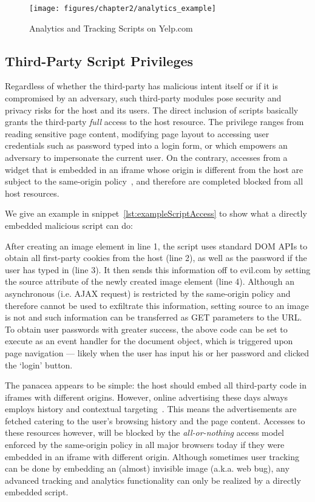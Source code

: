\begin{figure}[bth]
\centering
\texttt{[image: figures/chapter2/analytics\_example]}
\caption{Analytics and Tracking Scripts on Yelp.com}
\label{fig:analytics_example}
\end{figure}

\subsection{Third-Party Script Privileges}
Regardless of whether the third-party has malicious intent itself or if it is compromised by an adversary, such third-party modules pose security and privacy risks for the host and its users.  The direct inclusion of scripts basically grants the third-party \emph{full} access to the host resource.  The privilege ranges from reading sensitive page content, modifying page layout to accessing user credentials such as password typed into a login form, or  which empowers an adversary to impersonate the current user.  On the contrary, accesses from a widget that is embedded in an iframe whose origin is different from the host are subject to the same-origin policy~\cite{SOP}, and therefore are completed blocked from all host resources.

We give an example in snippet~\ref{lst:exampleScriptAccess} to show what a directly embedded malicious script can do:  



After creating an image element in line 1, the script uses standard DOM APIs to obtain all first-party cookies from the host (line 2), as well as the password if the user has typed in (line 3).  It then sends this information off to evil.com by setting the source attribute of the newly created image element (line 4).  Although an asynchronous  (i.e. AJAX request) is restricted by the same-origin policy and therefore cannot be used to exfiltrate this information, setting source to an image is not and such information can be transferred as GET parameters to the URL.  To obtain user passwords with greater success, the above code can be set to execute as an  event handler for the document object, which is triggered upon page navigation --- likely when the user has input his or her password and clicked the `login' button.

The panacea appears to be simple: the host should embed all third-party code in iframes with different origins.  However, online advertising these days always employs history and contextual targeting~\cite{Gill:2013:BPF:2504730.2504768}.  This means the advertisements are fetched catering to the user's browsing history and the page content.  Accesses to these resources however, will be blocked by the \emph{all-or-nothing} access model enforced by the same-origin policy in all major browsers today if they were embedded in an iframe with different origin.  Although sometimes user tracking can be done by embedding an (almost) invisible image (a.k.a. web bug), any advanced tracking and analytics functionality can only be realized by a directly embedded script.  

